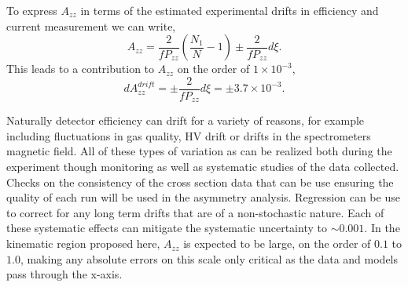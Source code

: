 To express $A_{zz}$ in terms of the estimated experimental drifts in efficiency and current measurement we can write,
\begin{equation}
A_{zz}=\frac{2}{fP_{zz}}\left(\frac{N_1}{N}-1\right)\pm\frac{2}{fP_{zz}}d\xi.
\end{equation}
This leads to a contribution to $A_{zz}$ on the order of $1\times10^{-3}$,
\begin{equation}
dA_{zz}^{drift}=\pm\frac{2}{fP_{zz}}d\xi=\pm3.7\times10^{-3}.
\end{equation}

Naturally detector efficiency can drift for a variety of reasons, for
example including fluctuations in gas quality, HV drift or
drifts in the spectrometers magnetic field.  All of these types of variation as can be realized both
during the experiment though monitoring as well as systematic studies of the data collected.
Checks on the consistency of the cross section data that can be use ensuring the quality of each run will be used in the asymmetry analysis.  Regression can be use to correct for any long term drifts that are of a non-stochastic nature.
Each of these systematic effects can mitigate the systematic uncertainty to $\sim0.001$. 
In the kinematic region proposed here, $A_{zz}$ is expected to be large, on the order of $0.1$ to $1.0$, making any absolute errors on this scale only critical as the data and models pass through the x-axis.  